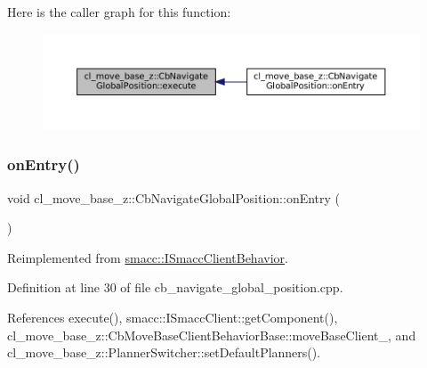 Here is the caller graph for this function\+:
\nopagebreak
\begin{figure}[H]
\begin{center}
\leavevmode
\includegraphics[width=350pt]{classcl__move__base__z_1_1CbNavigateGlobalPosition_a0b8525ea9e4388b27cb1f9b1e06a3b63_icgraph}
\end{center}
\end{figure}
\mbox{\label{classcl__move__base__z_1_1CbNavigateGlobalPosition_a66d8b0555ef2945bc108dcd5171be292}} 
\subsubsection{\texorpdfstring{on\+Entry()}{onEntry()}}
{\footnotesize\ttfamily void cl\+\_\+move\+\_\+base\+\_\+z\+::\+Cb\+Navigate\+Global\+Position\+::on\+Entry (\begin{DoxyParamCaption}{ }\end{DoxyParamCaption})\hspace{0.3cm}{\ttfamily [virtual]}}



Reimplemented from \hyperlink{classsmacc_1_1ISmaccClientBehavior_a3ec24a839087c550e1d62a81e48cf530}{smacc\+::\+I\+Smacc\+Client\+Behavior}.



Definition at line 30 of file cb\+\_\+navigate\+\_\+global\+\_\+position.\+cpp.



References execute(), smacc\+::\+I\+Smacc\+Client\+::get\+Component(), cl\+\_\+move\+\_\+base\+\_\+z\+::\+Cb\+Move\+Base\+Client\+Behavior\+Base\+::move\+Base\+Client\+\_\+, and cl\+\_\+move\+\_\+base\+\_\+z\+::\+Planner\+Switcher\+::set\+Default\+Planners().


